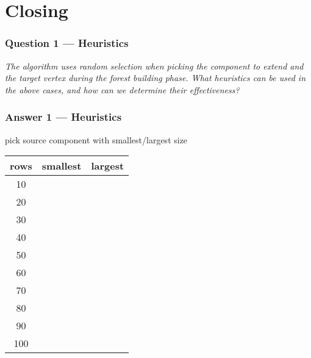 \section{Closing}

\begin{frame}
    \frametitle{Question 1 --- Heuristics}
    \textit{The algorithm uses random selection when picking the component to extend and the target vertex during the forest building phase.\vspace{\baselineskip}
    What \alert{heuristics} can be used in the above cases, and how can we determine their effectiveness?}
\end{frame}

\begin{frame}
    \frametitle{Answer 1 --- Heuristics}
    \begin{block}{pick source component with smallest/largest size}
    \vspace{10pt}
    \footnotesize
    \centering
    \begin{tabular}{ c|c|c }
        \textbf{rows} & \textbf{smallest} & \textbf{largest} \\
        \hline
        10 & \color{orange}{-0.43\%} & \color{orange}{-38.3\%} \\
        \hline
        20 & \color{dkgreen}{10.55\%} & \color{dkgreen}{2.61\%} \\
        \hline
        30 & \color{orange}{-1.74\%} & \color{dkgreen}{9.57\%} \\
        \hline
        40 & \color{orange}{-2.22\%} & \color{orange}{-1.9\%} \\
        \hline
        50 & \color{orange}{-18.92\%} & \color{orange}{-11.40\%} \\
        \hline
        60 & \color{dkgreen}{3.31\%} & \color{dkgreen}{4.92\%} \\
        \hline
        70 & \color{orange}{-8.1\%} & \color{orange}{-0.29\%} \\
        \hline
        80 & \color{orange}{-0.48\%} & \color{orange}{-0.84\%} \\
        \hline
        90 & \color{dkgreen}{0.99\%} & \color{dkgreen}{1.05\%} \\
        \hline
        100 & \color{dkgreen}{0.11\%} & \color{orange}{-0.09\%} \\
    \end{tabular}
    \end{block}
\end{frame}

